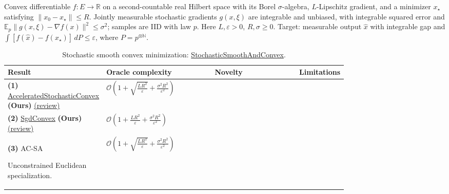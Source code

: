 \begin{table}[tp]
\centering
\caption{Stochastic smooth convex minimization: \href{https://github.com/k3nfalt/longtails/blob/main/LongTails/Setups/StochasticSmoothAndConvex.lean}{StochasticSmoothAndConvex}.}\label{tab:StochasticSmoothAndConvex}
\parbox{\linewidth}{\footnotesize Convex differentiable $f:E\to\mathbb R$ on a second-countable real Hilbert space with its Borel $\sigma$-algebra, $L$-Lipschitz gradient, and a minimizer $x_\star$ satisfying $\|x_0-x_\star\|\le R$. Jointly measurable stochastic gradients $g(x,\xi)$ are integrable and unbiased, with integrable squared error and $\mathbb E_p\|g(x,\xi)-\nabla f(x)\|^2\le\sigma^2$; samples are IID with law $p$. Here $L,\varepsilon>0$, $R,\sigma\ge0$. Target: measurable output $\widehat x$ with integrable gap and $\int[f(\widehat x)-f(x_\star)]\,dP\le\varepsilon$, where $P=p^{\otimes\mathbb N}$.}\par\smallskip
\begin{threeparttable}
\footnotesize
\setlength{\tabcolsep}{4pt}\renewcommand{\arraystretch}{1.25}
\begin{tabularx}{\linewidth}{@{}>{\raggedright\arraybackslash}p{0.20\linewidth}>{\raggedright\arraybackslash}p{0.32\linewidth}>{\raggedright\arraybackslash}p{0.25\linewidth}>{\raggedright\arraybackslash}X@{}}
\toprule
\textbf{Result} & \textbf{Oracle complexity} & \textbf{Novelty} & \textbf{Limitations} \\
\midrule
\textbf{(1)} \href{https://github.com/k3nfalt/longtails/blob/main/LongTails/Theorems/AcceleratedStochasticConvex.lean}{Accelerated\allowbreak Stochastic\allowbreak Convex} \textbf{(Ours)} \href{https://github.com/k3nfalt/longtails/blob/main/scripts/reviews/AcceleratedStochasticConvex.md}{(review)}
& $\mathcal{O}\!\left(1+\sqrt{\frac{LR^2}{\varepsilon}}+\frac{\sigma^2R^2}{\varepsilon^2}\right)$ & & \\
\midrule
\textbf{(2)} \href{https://github.com/k3nfalt/longtails/blob/main/LongTails/Theorems/SgdConvex.lean}{Sgd\allowbreak Convex} \textbf{(Ours)} \href{https://github.com/k3nfalt/longtails/blob/main/scripts/reviews/SgdConvex.md}{(review)}
& $\mathcal{O}\!\left(1+\frac{LR^2}{\varepsilon}+\frac{\sigma^2R^2}{\varepsilon^2}\right)$ & & \\
\midrule[1.2pt]
\textbf{(3)} AC-SA \citep[Prop.~7, (4.10)--(4.11), June 2012 revision]{sscvGhadimiLan2012}
\par Unconstrained Euclidean specialization.
& $\mathcal{O}\!\left(1+\sqrt{\frac{LR^2}{\varepsilon}}+\frac{\sigma^2R^2}{\varepsilon^2}\right)$

\end{tabularx}
\end{threeparttable}
\end{table}
